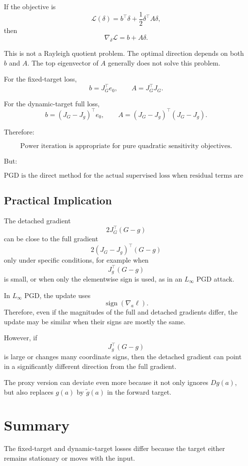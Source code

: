 \documentclass{article}
\begin{document}
If the objective is
\[
    \mathcal L(\delta)
    =
    b^\top \delta
    +
    \frac{1}{2}\delta^\top A\delta,
\]
then
\[
    \nabla_\delta \mathcal L
    =
    b+A\delta.
\]

This is not a Rayleigh quotient problem. The optimal direction depends on both \(b\) and \(A\). The top eigenvector of \(A\) generally does not solve this problem.

For the fixed-target loss,
\[
    b=J_G^\top e_0,
    \qquad
    A=J_G^\top J_G.
\]

For the dynamic-target full loss,
\[
    b=(J_G-J_g)^\top e_0,
    \qquad
    A=(J_G-J_g)^\top(J_G-J_g).
\]

Therefore:

\[
\boxed{
\text{Power iteration is appropriate for pure quadratic sensitivity objectives.}
}
\]

But:

\[
\boxed{
\text{PGD is the direct method for the actual supervised loss when residual terms are present.}
}
\]

\subsection{Practical Implication}

The detached gradient
\[
    2J_G^\top(G-g)
\]
can be close to the full gradient
\[
    2(J_G-J_g)^\top(G-g)
\]
only under specific conditions, for example when
\[
    J_g^\top(G-g)
\]
is small, or when only the elementwise sign is used, as in an \(L_\infty\) PGD attack.

In \(L_\infty\) PGD, the update uses
\[
    \operatorname{sign}(\nabla_a \ell).
\]
Therefore, even if the magnitudes of the full and detached gradients differ, the update may be similar when their signs are mostly the same.

However, if
\[
    J_g^\top(G-g)
\]
is large or changes many coordinate signs, then the detached gradient can point in a significantly different direction from the full gradient.

The proxy version can deviate even more because it not only ignores \(Dg(a)\), but also replaces \(g(a)\) by \(\tilde g(a)\) in the forward target.

\section{Summary}

The fixed-target and dynamic-target losses differ because the target either remains stationary or moves with the input.
\end{document}
